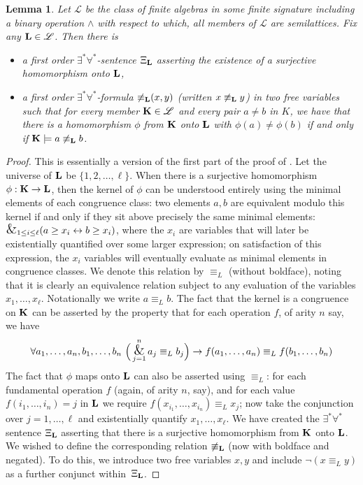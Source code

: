 \documentclass[10pt,a4paper]{amsart}
\theoremstyle{plain}
\newtheorem{lem}[thm]{Lemma}
\theoremstyle{definition}
\newcommand{\up}[1]{\textup{#1}}
\newcommand{\bigand}{\operatornamewithlimits{\hbox{\Large$\&$}}}
\begin{document}
\begin{lem}\label{lem:onto}
Let $\mathscr{L}$ be the class of finite algebras in some finite signature including a binary operation $\wedge$ with respect to which, all members of $\mathscr{L}$ are semilattices.  Fix any ${\bf L}\in\mathscr{L}$.  Then there is
\begin{itemize}
\item a first order $\exists^*\forall^*$-sentence $\Xi_{\bf L}$ asserting the existence of a surjective homomorphism onto ${\bf L}$,
\item a first order $\exists^*\forall^*$-formula ${\not\equiv_{\bf L}}(x,y)$ \up(written $x\not\equiv_{\bf L}y$\up) in two free variables such that for every member ${\bf K}\in\mathscr{L}$ and every pair $a\neq b$ in  $K$, we have that there is a homomorphism $\phi$ from ${\bf K}$ onto ${\bf L}$ with $\phi(a)\neq \phi(b)$ if and only if ${\bf K}\models a\not\equiv_{\bf L}b$.
\end{itemize}
\end{lem}
\begin{proof}
This is essentially a version of the first part of the proof of \cite[Theorem~4.2]{CDJP}.  Let the universe of ${\bf L}$ be $\{1,2,\dots,\ell\}$.  When there is a surjective homomorphism $\phi:{\bf K}\to {\bf L}$, then the kernel of $\phi$ can be understood entirely using the minimal elements of each congruence class: two elements $a,b$ are equivalent modulo this kernel if and only if they sit above precisely the same minimal elements: $\bigand_{1\leq i\leq \ell} (a\geq x_i\leftrightarrow b\geq x_i)$, where the $x_i$ are variables that  will later be existentially quantified over some larger expression; on satisfaction of this expression, the $x_i$ variables will eventually evaluate as minimal elements in congruence classes.  We denote this relation by $\equiv_L$ (without boldface), noting that it is clearly an equivalence relation subject to any evaluation of the variables $x_1,\dots,x_\ell$.  Notationally we write $a\equiv_L b$.  The fact that the kernel is a congruence on ${\bf K}$ can be asserted by the property that for each operation $f$, of arity $n$ say, we have
\[
\forall a_1,\dots,a_n,b_1,\dots,b_n\ \Big(\bigand_{j=1}^n a_j\equiv_L b_j\Big)\rightarrow f(a_1,\dots,a_n)\equiv_L f(b_1,\dots,b_n)
\]
The fact that $\phi$ maps onto ${\bf L}$ can also be asserted using $\equiv_L$: for each fundamental operation $f$ (again, of arity $n$, say), and for each value $f(i_1,\dots,i_n)=j$ in ${\bf L}$ we require $f(x_{i_1},\dots,x_{i_n})\equiv_L x_j$; now take the conjunction over $j=1,\dots,\ell$ and existentially quantify $x_1,\dots,x_\ell$.
We have created the $\exists^*\forall^*$ sentence $\Xi_{\bf L}$ asserting that there is a surjective homomorphism from ${\bf K}$ onto ${\bf L}$. 
We wished to define the corresponding relation $\not\equiv_{\bf L}$ (now with boldface and negated).  To do this, we introduce two free variables $x,y$ and include $\neg(x\equiv_L y)$ as a further conjunct within~$\Xi_{\bf L}$.
\end{proof}
\end{document}
